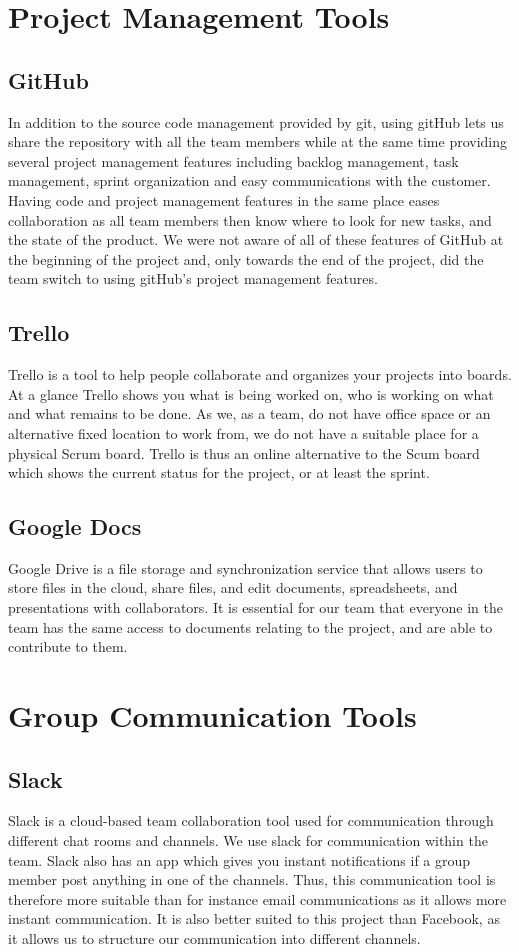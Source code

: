 \section{Project Management Tools}
\subsection{GitHub}
In addition to the source code management provided by git, using gitHub lets us share the repository with all the team members while at the same time providing several project management features including backlog management, task management, sprint organization and easy communications with the customer. Having code and project management features in the same place eases collaboration as all team members then know where to look for new tasks, and the state of the product. We were not aware of all of these features of GitHub at the beginning of the project and, only towards the end of the project, did the team switch to using gitHub's project management features. 
\subsection{Trello}
Trello is a tool to help people collaborate and organizes your projects into boards. At a glance Trello shows you what is being worked on, who is working on what and what remains to be done. 
As we, as a team,  do not have office space or an alternative fixed location to work from, we do not have a suitable place for a physical Scrum board. Trello is  thus an online alternative to the Scum board which shows the current status for the project, or at least the sprint.
\subsection{Google Docs}
Google Drive is a file storage and synchronization service that allows users to store files in the cloud, share files, and edit documents, spreadsheets, and presentations with collaborators. It is essential for our team that everyone in the team has the same access to documents relating to the project, and are able to contribute to them.
\section{Group Communication Tools}
\subsection{Slack}
Slack is a cloud-based team collaboration tool used for communication through different chat rooms and channels. We use slack for communication within the team. Slack also has an app which gives you  instant notifications if a group member post anything in one of the channels. Thus, this communication tool is therefore more suitable than for instance email communications as it allows more instant communication. It is also better suited to this project than Facebook, as it allows us to structure our communication into different channels. 

